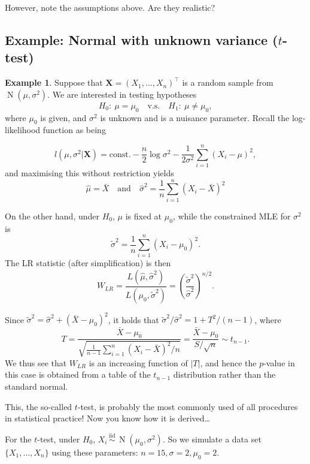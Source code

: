 \documentclass[
]{book}
\newcommand{\bX}{{\boldsymbol X}}
\DeclareMathOperator{\N}{N}
\newcommand{\iid}{\,\overset{\text{iid}}{\sim}\,}
\newcommand{\const}{\text{const.}}
\theoremstyle{definition}
\theoremstyle{definition}
\newtheorem{example}{Example}[chapter]
\theoremstyle{definition}
\theoremstyle{definition}
\theoremstyle{remark}
\begin{document}
However, note the assumptions above. Are they realistic?

\hypertarget{example-normal-with-unknown-variance-t-test}{%
\subsection{\texorpdfstring{Example: Normal with unknown variance (\(t\)-test)}{Example: Normal with unknown variance (t-test)}}\label{example-normal-with-unknown-variance-t-test}}

\begin{example}
Suppose that \(\bX=(X_1,\dots,X_n)^\top\) is a random sample from \(\N(\mu,\sigma^2)\). We are interested in testing hypotheses
\[H_0: \ \mu = \mu_0 \hspace{1em}\text{v.s.}\hspace{1em} H_1: \ \mu \neq \mu_0,\]
where \(\mu_0\) is given, and \(\sigma^2\) is unknown and is a nuisance parameter.
Recall the log-likelihood function as being

\[l(\mu,\sigma^2|\bX) = \const -\frac{n}{2}\log\sigma^2 -\frac{1}{2\sigma^2}\sum_{i=1}^n (X_i-\mu)^2,\]
and maximising this without restriction yields
\[\hat\mu = \bar X \hspace{1em}\text{and}\hspace{1em} \hat\sigma^2 = \frac{1}{n}\sum_{i=1}^n(X_i-\bar X)^2\]

On the other hand, under \(H_0\), \(\mu\) is fixed at \(\mu_0\), while the constrained MLE for \(\sigma^2\) is
\[\tilde\sigma^2 = \frac{1}{n}\sum_{i=1}^n(X_i-\mu_0)^2.\] The LR statistic (after simplification) is then
\[W_{LR} = \frac{L(\hat\mu,\hat\sigma^2)}{L(\mu_0,\tilde\sigma^2)} = \left( \frac{\tilde\sigma^2}{\hat\sigma^2}\right)^{n/2}.\]

Since \(\tilde\sigma^2 = \hat\sigma^2 + (\bar X - \mu_0)^2\), it holds
that \(\tilde\sigma^2/\hat\sigma^2 = 1 + T^2/(n-1)\), where
\[T = \frac{\bar X - \mu_0}{\sqrt{\frac{1}{n-1}\sum_{i=1}^n (X_i-\bar X)^2 \Big/ n}} = \frac{\bar X - \mu_0}{S/\sqrt n} \sim t_{n-1}.\]
We thus see that \(W_{LR}\) is an increasing function of \(|T|\), and hence the \(p\)-value in this case is obtained from a table of the \(t_{n-1}\) distribution rather than the standard normal.
\end{example}

This, the so-called \(t\)-test, is probably the most commonly used of all procedures in statistical practice! Now you know how it is derived\ldots{}

For the \(t\)-test, under \(H_0\), \(X_i\iid\N(\mu_0,\sigma^2)\). So we simulate a data set \(\{X_1,\dots,X_{n}\}\) using these parameters: \(n=15, \sigma=2, \mu_0=2\).
\end{document}
